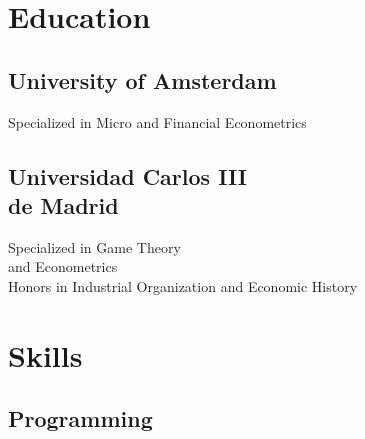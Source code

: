 \documentclass[]{deedy-resume-openfont}
\begin{document}
%
%
\lastupdated

%
%





%
%

\begin{minipage}[t]{0.33\textwidth} 


\section{Education} 

\subsection{University of Amsterdam}
Specialized in Micro and Financial Econometrics
\sectionsep

\subsection{Universidad Carlos III \\ de Madrid}
Specialized in Game Theory \\ and Econometrics \\
Honors in Industrial Organization and Economic History \\
\sectionsep


\section{Skills}
\subsection{Programming}


\end{minipage}
\end{document}
